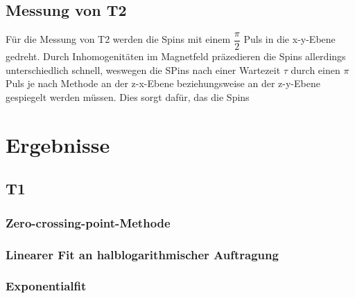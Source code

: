 \documentclass[12pt,a4paper]{article}
\begin{document}
\subsection{Messung von T2}

Für die Messung von T2 werden die Spins mit einem  $\dfrac{\pi}{2}$ Puls in die x-y-Ebene gedreht. Durch Inhomogenitäten im Magnetfeld präzedieren die Spins allerdings unterschiedlich schnell, weswegen die SPins nach einer Wartezeit $\tau$ durch einen $\pi$ Puls je nach Methode an der z-x-Ebene beziehungsweise an der z-y-Ebene gespiegelt werden müssen. Dies sorgt dafür, das die Spins 


\section{Ergebnisse}

\subsection{T1}
\subsubsection{Zero-crossing-point-Methode}
\subsubsection{Linearer Fit an halblogarithmischer Auftragung}
\subsubsection{Exponentialfit}
\end{document}
